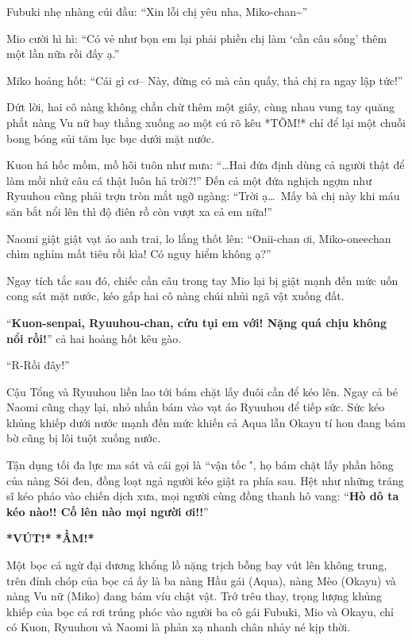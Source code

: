 \documentclass[../main.tex]{subfiles}
\begin{document}
Fubuki nhẹ nhàng cúi đầu: ``Xin lỗi chị yêu nha, Miko-chan\~{}''

Mio cười hì hì: ``Có vẻ như bọn em lại phải phiền chị làm `cần câu sống' thêm một lần nữa rồi đấy ạ.''

Miko hoảng hốt: ``Cái gì cơ-- Này, đừng có mà càn quấy, thả chị ra ngay lập tức!''

Dứt lời, hai cô nàng không chần chừ thêm một giây, cùng nhau vung tay quăng phắt nàng Vu nữ bay thẳng xuống ao một cú rõ kêu *TÕM!* chỉ để lại một chuỗi bong bóng sủi tăm lục bục dưới mặt nước.

Kuon há hốc mồm, mồ hôi tuôn như mưa: ``\dots Hai đứa định dùng cả người thật để làm mồi nhử câu cá thật luôn hả trời?!'' Đến cả một đứa nghịch ngợm như Ryuuhou cũng phải trợn tròn mắt ngỡ ngàng: ``Trời ạ\dots\ Mấy bà chị này khi máu săn bắt nổi lên thì độ điên rồ còn vượt xa cả em nữa!''

Naomi giật giật vạt áo anh trai, lo lắng thốt lên: ``Onii-chan ơi, Miko-oneechan chìm nghỉm mất tiêu rồi kìa! Có nguy hiểm không ạ?''

Ngay tích tắc sau đó, chiếc cần câu trong tay Mio lại bị giật mạnh đến mức uốn cong sát mặt nước, kéo gấp hai cô nàng chúi nhủi ngã vật xuống đất.

``\textbf{Kuon-senpai, Ryuuhou-chan, cứu tụi em với! Nặng quá chịu không nổi rồi!}'' cả hai hoảng hốt kêu gào.

``R-Rồi đây!''

Cậu Tổng và Ryuuhou liền lao tới bám chặt lấy đuôi cần để kéo lên. Ngay cả bé Naomi cũng chạy lại, nhỏ nhắn bám vào vạt áo Ryuuhou để tiếp sức. Sức kéo khủng khiếp dưới nước mạnh đến mức khiến cả Aqua lẫn Okayu tí hon đang bám bờ cũng bị lôi tuột xuống nước.

Tận dụng tối đa lực ma sát và cái gọi là ``vận tốc \hll\'', họ bám chặt lấy phần hông của nàng Sói đen, đồng loạt ngả người kéo giật ra phía sau. Hệt như những tráng sĩ kéo pháo vào chiến dịch xưa, mọi người cùng đồng thanh hô vang: ``\textbf{Hò dô ta kéo nào!! Cố lên nào mọi người ơi!!}''

\textbf{*VÚT!* *ẦM!*}

Một bọc cá ngừ đại dương khổng lồ nặng trịch bỗng bay vút lên không trung, trên đỉnh chóp của bọc cá ấy là ba nàng Hầu gái (Aqua), nàng Mèo (Okayu) và nàng Vu nữ (Miko) đang bám víu chật vật. Trớ trêu thay, trọng lượng khủng khiếp của bọc cá rơi trúng phóc vào người ba cô gái Fubuki, Mio và Okayu, chỉ có Kuon, Ryuuhou và Naomi là phản xạ nhanh chân nhảy né kịp thời.
\end{document}
